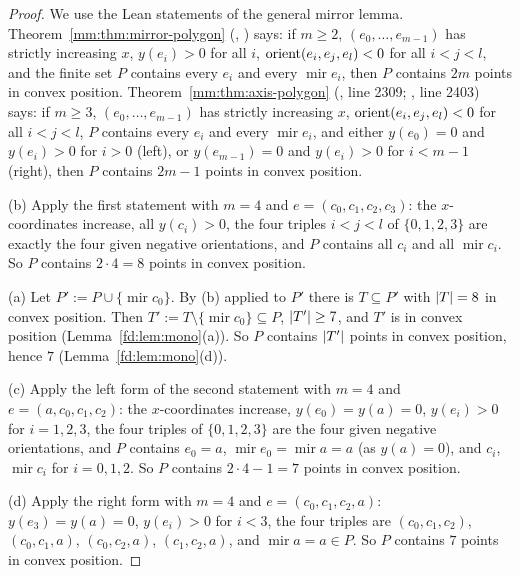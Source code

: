 \begin{proof}
We use the Lean statements of the general mirror lemma. Theorem~\ref{mm:thm:mirror-polygon} (,
) says: if $m\ge2$, $(e_0,\dots,e_{m-1})$ has strictly increasing $x$,
$y(e_i)>0$ for all $i$, $\operatorname{orient}(e_i,e_j,e_l)<0$ for all $i<j<l$, and the finite set $P$ contains every $e_i$ and every
$\operatorname{mir}e_i$, then $P$ contains $2m$ points in convex position. Theorem~\ref{mm:thm:axis-polygon}
(, line 2309; , line 2403) says: if $m\ge3$, $(e_0,\dots,e_{m-1})$ has
strictly increasing $x$, $\operatorname{orient}(e_i,e_j,e_l)<0$ for all $i<j<l$, $P$ contains every $e_i$ and every
$\operatorname{mir}e_i$, and either $y(e_0)=0$ and $y(e_i)>0$ for $i>0$ (left), or $y(e_{m-1})=0$ and $y(e_i)>0$ for
$i<m-1$ (right), then $P$ contains $2m-1$ points in convex position.

(b) Apply the first statement with $m=4$ and $e=(c_0,c_1,c_2,c_3)$: the $x$-coordinates increase, all $y(c_i)>0$, the
four triples $i<j<l$ of $\{0,1,2,3\}$ are exactly the four given negative orientations, and $P$ contains all $c_i$ and
all $\operatorname{mir}c_i$. So $P$ contains $2\cdot4=8$ points in convex position.

(a) Let $P':=P\cup\{\operatorname{mir}c_0\}$. By (b) applied to $P'$ there is $T\subseteq P'$ with $\lvert T\rvert=8$ in convex
position. Then $T':=T\setminus\{\operatorname{mir}c_0\}\subseteq P$, $\lvert T'\rvert\ge7$, and $T'$ is in convex position
(Lemma~\ref{fd:lem:mono}(a)). So $P$ contains $\lvert T'\rvert$ points in convex position, hence $7$
(Lemma~\ref{fd:lem:mono}(d)).

(c) Apply the left form of the second statement with $m=4$ and $e=(a,c_0,c_1,c_2)$: the $x$-coordinates increase,
$y(e_0)=y(a)=0$, $y(e_i)>0$ for $i=1,2,3$, the four triples of $\{0,1,2,3\}$ are the four given negative orientations,
and $P$ contains $e_0=a$, $\operatorname{mir}e_0=\operatorname{mir}a=a$ (as $y(a)=0$), and $c_i$, $\operatorname{mir}c_i$
for $i=0,1,2$. So $P$ contains $2\cdot4-1=7$ points in convex position.

(d) Apply the right form with $m=4$ and $e=(c_0,c_1,c_2,a)$: $y(e_3)=y(a)=0$, $y(e_i)>0$ for $i<3$, the four triples are
$(c_0,c_1,c_2)$, $(c_0,c_1,a)$, $(c_0,c_2,a)$, $(c_1,c_2,a)$, and $\operatorname{mir}a=a\in P$. So $P$ contains $7$ points
in convex position.
\end{proof}

